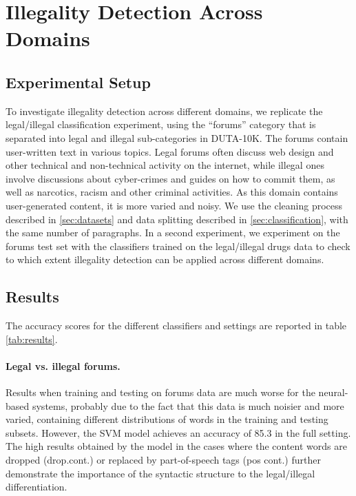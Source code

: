 \documentclass[11pt,a4paper,table]{article}
\begin{document}
\section{Illegality Detection Across Domains}

\subsection{Experimental Setup}

To investigate illegality detection across different domains, we replicate the legal/illegal classification experiment, using the  ``forums'' category that is separated into legal and illegal sub-categories in DUTA-10K.
The forums  contain user-written text in various topics. Legal forums often discuss web design and other technical
and non-technical activity on the internet, while illegal ones involve
discussions about cyber-crimes and guides on how to commit them,
as well as narcotics, racism and other criminal activities.
As this domain contains user-generated content, it is more varied
and noisy. We use the cleaning process described in \ref{sec:datasets} and data splitting described in \ref{sec:classification}, with the same number of paragraphs.
In a second experiment, we experiment on the forums test set with the classifiers trained on the legal/illegal drugs data to check to which extent illegality detection can be applied across different domains.  

\subsection{Results}

The accuracy scores for the different classifiers and settings are reported in table \ref{tab:results}.

\paragraph{Legal vs. illegal forums.}

Results when training and testing on forums data are much worse for the neural-based systems,
probably due to the fact that this data is much noisier and more varied,
containing different distributions of words in the training and testing
subsets. However, the SVM model achieves an accuracy of 85.3 in the full setting. The high results obtained by the model in the cases where the content words are dropped (drop.cont.) or replaced by part-of-speech tags (pos cont.) further demonstrate the importance of the syntactic structure to the legal/illegal differentiation.  
\end{document}
